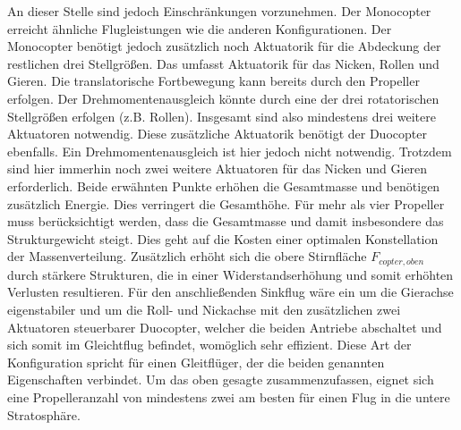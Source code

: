 An dieser Stelle sind jedoch Einschränkungen vorzunehmen. 
Der Monocopter erreicht ähnliche Flugleistungen wie die anderen Konfigurationen. Der Monocopter benötigt jedoch zusätzlich noch Aktuatorik für die Abdeckung der restlichen drei Stellgrößen. Das umfasst Aktuatorik für das Nicken, Rollen und Gieren. Die translatorische Fortbewegung kann bereits durch den Propeller erfolgen. Der Drehmomentenausgleich könnte durch eine der drei rotatorischen Stellgrößen erfolgen (z.B. Rollen). Insgesamt sind also mindestens drei weitere Aktuatoren notwendig. Diese zusätzliche Aktuatorik benötigt der Duocopter ebenfalls. Ein Drehmomentenausgleich ist hier jedoch nicht notwendig. Trotzdem sind hier immerhin noch zwei weitere Aktuatoren für das Nicken und Gieren erforderlich. 
Beide erwähnten Punkte erhöhen die Gesamtmasse und benötigen zusätzlich Energie. Dies verringert die Gesamthöhe. 
Für mehr als vier Propeller muss berücksichtigt werden, dass die Gesamtmasse und damit insbesondere das Strukturgewicht steigt. Dies geht auf die Kosten einer optimalen Konstellation der Massenverteilung. Zusätzlich erhöht sich die obere Stirnfläche \ensuremath{F_{copter,oben}} durch stärkere Strukturen, die in einer Widerstandserhöhung und somit erhöhten Verlusten resultieren. 
Für den anschließenden Sinkflug wäre ein um die Gierachse eigenstabiler und um die Roll- und Nickachse mit den zusätzlichen zwei Aktuatoren steuerbarer Duocopter, welcher die beiden Antriebe abschaltet und sich somit im Gleichtflug befindet, womöglich sehr effizient. Diese Art der Konfiguration spricht für einen Gleitflüger, der die beiden genannten Eigenschaften verbindet.
Um das oben gesagte zusammenzufassen, eignet sich eine Propelleranzahl von mindestens zwei am besten für einen Flug in die untere Stratosphäre. \\


